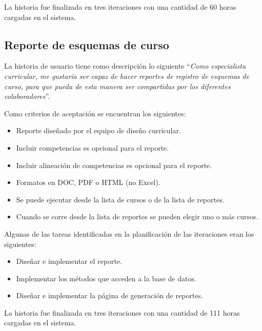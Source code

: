 La historia fue finalizada en tres iteraciones con una cantidad de 60 horas cargadas en el sistema.

\subsection{Reporte de esquemas de curso}
La historia de usuario tiene como descripción lo siguiente \enquote{\textit{Como especialista curricular, me gustaría ser capaz de hacer reportes de registro de esquemas de curso, para que pueda de esta manera ser compartidas por los diferentes colaboradores}}.

Como criterios de aceptación se encuentran los siguientes:
\begin{itemize}
	\item Reporte diseñado por el equipo de diseño curricular.
	\item Incluir competencias es opcional para el reporte.
	\item Incluir alineación de competencias es opcional para el reporte.
	\item Formatos en DOC, PDF o HTML (no Excel).
	\item Se puede ejecutar desde la lista de cursos o de la lista de reportes.
	\item Cuando se corre desde la lista de reportes se pueden elegir uno o más cursos.
\end{itemize}

Algunas de las tareas identificadas en la planificación de las iteraciones eran los siguientes:
\begin{itemize}
	\item Diseñar e implementar el reporte.
	\item Implementar los métodos que acceden a la base de datos.
	\item Diseñar e implementar la página de generación de reportes.
\end{itemize}

La historia fue finalizada en tres iteraciones con una cantidad de 111 horas cargadas en el sistema.